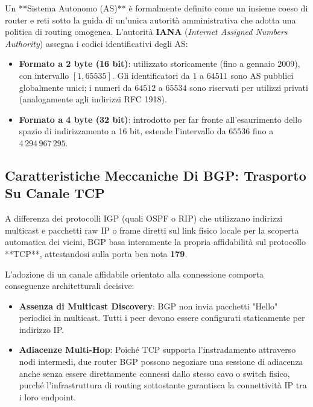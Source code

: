 \documentclass[11pt, a4paper]{article}
\begin{document}
Un **Sistema Autonomo (AS)** è formalmente definito come un insieme coeso di router e reti sotto la guida di un'unica autorità amministrativa che adotta una politica di routing omogenea. L'autorità \textbf{IANA} (\emph{Internet Assigned Numbers Authority}) assegna i codici identificativi degli AS:
\begin{itemize}[noitemsep]
    \item \textbf{Formato a 2 byte (16 bit)}: utilizzato storicamente (fino a gennaio 2009), con intervallo $[1, 65535]$. Gli identificatori da $1$ a $64511$ sono AS pubblici globalmente unici; i numeri da $64512$ a $65534$ sono riservati per utilizzi privati (analogamente agli indirizzi RFC 1918).
    \item \textbf{Formato a 4 byte (32 bit)}: introdotto per far fronte all'esaurimento dello spazio di indirizzamento a 16 bit, estende l'intervallo da $65536$ fino a $4\,294\,967\,295$.
\end{itemize}

\subsection{Caratteristiche Meccaniche Di BGP: Trasporto Su Canale TCP}

A differenza dei protocolli IGP (quali OSPF o RIP) che utilizzano indirizzi multicast e pacchetti raw IP o frame diretti sul link fisico locale per la scoperta automatica dei vicini, BGP basa interamente la propria affidabilità sul protocollo **TCP**, attestandosi sulla porta ben nota \textbf{179}.


L'adozione di un canale affidabile orientato alla connessione comporta conseguenze architetturali decisive:
\begin{itemize}[noitemsep]
    \item \textbf{Assenza di Multicast Discovery}: BGP non invia pacchetti "Hello" periodici in multicast. Tutti i peer devono essere configurati staticamente per indirizzo IP.
    \item \textbf{Adiacenze Multi-Hop}: Poiché TCP supporta l'instradamento attraverso nodi intermedi, due router BGP possono negoziare una sessione di adiacenza anche senza essere direttamente connessi dallo stesso cavo o switch fisico, purché l'infrastruttura di routing sottostante garantisca la connettività IP tra i loro endpoint.
\end{itemize}
\end{document}
